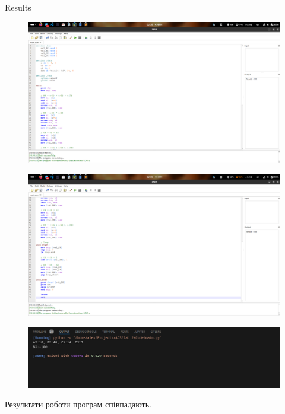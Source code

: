 \documentclass[a4paper,12pt]{article}
\begin{document}
\newpage
    \begin{center}
        \Large{Results}
    \end{center}
    \begin{figure}[h!]
        \begin{minipage}[h]{1\linewidth}
            \centering
            \includegraphics[width=1\linewidth]{Prt sc/1_1.png}  
        \end{minipage}
    \end{figure}
    \begin{figure}[h!]
        \begin{minipage}[h]{1\linewidth}
            \centering
            \includegraphics[width=1\linewidth]{Prt sc/1_2.png}  
        \end{minipage}
    \end{figure}

\newpage
    \begin{figure}[h!]
        \begin{minipage}[h]{1\linewidth}
            \centering
            \includegraphics[width=1\linewidth]{Prt sc/python_code_2.png}  
        \end{minipage}
    \end{figure}
    Результати роботи програм співпадають.
\end{document}
